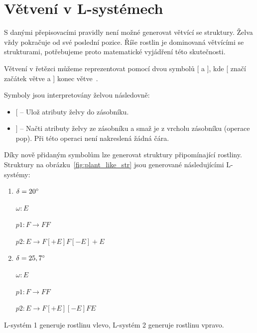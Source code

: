 \documentclass[thesis=M,czech]{FITthesis}[2019/12/23]
\begin{document}
\section{Větvení v L-systémech}
S danými přepisovacími pravidly není možné generovat větvící se struktury. Želva vždy pokračuje od své poslední pozice. Říše rostlin je dominovaná větvícími se strukturami, potřebujeme proto matematické vyjádření této skutečnosti.

Větvení v řetězci můžeme reprezentovat pomocí dvou symbolů [ a ], kde [ značí začátek větve a ] konec větve~\cite{abop24}.

Symboly jsou interpretovány želvou následovně:

\begin{itemize}
\item $[$ -- Ulož atributy želvy do zásobníku.
\item $]$ -- Načti atributy želvy ze zásobníku a smaž je z vrcholu zásobníku (operace pop). Při této operaci není nakreslená žádná čára.
\end{itemize}

Díky nově přidaným symbolům lze generovat struktury připomínající rostliny. Struktury na obrázku~\ref{fig:plant_like_str} jsou generované následujícími L-systémy:

\begin{enumerate}
\item $\delta = 20\degree$

	$\omega: E$
	
	$p1: F \rightarrow FF$
	
	$p2: E \rightarrow F[+E]F[-E]+E$
	
\item $\delta = 25,7\degree$

	$\omega: E$
	
	$p1: F \rightarrow FF$
	
	$p2: E \rightarrow F[+E][-E]FE$

\end{enumerate}

L-systém 1 generuje rostlinu vlevo, L-systém 2 generuje rostlinu vpravo.
\end{document}
